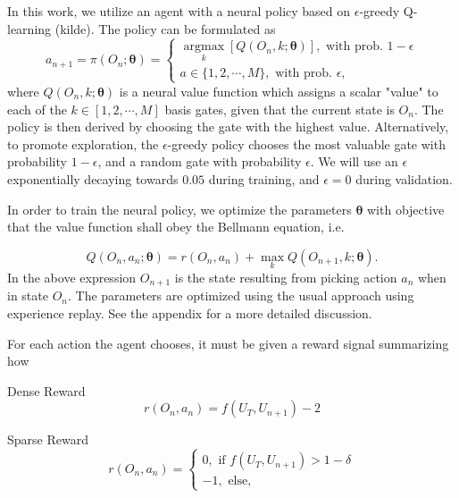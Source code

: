 \documentclass[%
 aip,
 floatfix,
 amsmath,amssymb,
 reprint,%
]{revtex4-1}
\begin{document}
In this work, we utilize an agent with a neural policy based on $\epsilon$-greedy Q-learning (kilde). The policy can be formulated as
\begin{equation}\label{eq:policy}
    a_{n+1} = \pi(O_n; \boldsymbol{\theta}) =
    \begin{cases} 
        \underset{k}{\operatorname{argmax}} [Q(O_n, k; \boldsymbol{\theta})], \text{ with prob. $1 - \epsilon$}\\
        a \in \{1, 2, \cdots, M\}, \text{ with prob. $\epsilon$},
    \end{cases}
\end{equation}
where $Q(O_n, k; \boldsymbol{\theta})$ is a neural value function which assigns a scalar "value" to each of the $k\in [1,2,\cdots, M]$ basis gates, given that the current state is $O_n$. The policy is then derived by choosing the gate with the highest value. Alternatively, to promote exploration, the $\epsilon$-greedy policy chooses the most valuable gate with probability $1-\epsilon$, and a random gate with probability $\epsilon$. We will use an $\epsilon$ exponentially decaying towards $0.05$ during training, and $\epsilon = 0$ during validation. 

In order to train the neural policy, we optimize the parameters $\boldsymbol{\theta}$ with objective that the value function shall obey the Bellmann equation, i.e.

\begin{equation}
    Q(O_n, a_n; \boldsymbol{\theta}) = r(O_n, a_n) + \max_{k} Q(O_{n+1}, k; \boldsymbol{\theta}).
\end{equation}
In the above expression $O_{n+1}$ is the state resulting from picking action $a_n$ when in state $O_n$. The parameters are optimized using the usual approach using experience replay. See the appendix for a more detailed discussion. 

For each action the agent chooses, it must be given a reward signal summarizing how 


Dense Reward
\begin{equation}
    r(O_n, a_n) = f(U_T, U_{n+1}) - 2 
\end{equation}


Sparse Reward
\begin{equation}
    r(O_n, a_n) = 
    \begin{cases} 
        0, \text{ if $f(U_T, U_{n+1})> 1 - \delta$}\\
        -1, \text{ else},
    \end{cases}
\end{equation}
\end{document}
